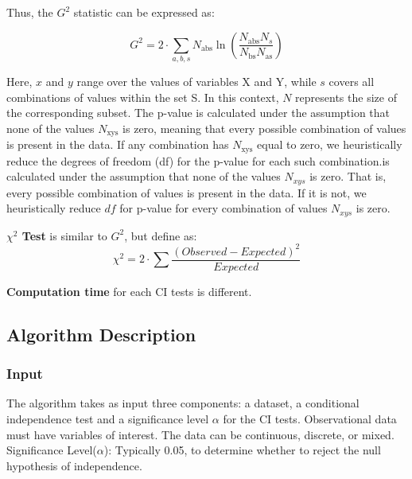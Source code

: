 \documentclass[main.tex]{subfiles}
\begin{document}
Thus, the $ G^2 $ statistic can be expressed as:

\[
G^2 = 2 \cdot \sum_{a,b,s} N_{\text{abs}} \ln \left( \frac{N_{\text{abs}} N_s}{N_{\text{bs}} N_{\text{as}}} \right)
\]

Here, $ x $ and $ y $ range over the values of variables X and Y, while $ s $ covers all combinations of values within the set S. In this context, $ N $ represents the size of the corresponding subset. The p-value is calculated under the assumption that none of the values $ N_{\text{xys}} $ is zero, meaning that every possible combination of values is present in the data. If any combination has $ N_{\text{xys}} $ equal to zero, we heuristically reduce the degrees of freedom (df) for the p-value for each such combination.is calculated under the assumption that none of the values $N_{xys}$ is zero. That 
is, every possible combination of values is present in the data. If it is not, we heuristically reduce $df$ for p-value for every combination of values $N_{xys}$ is zero.

\textbf{$ \chi^2 $ Test} is similar to $G^2$, but define as:
\[\chi ^2 = 2 \cdot \sum \frac{(Observed - Expected)^2}{Expected}\]

\textbf{Computation time} for each CI tests is different. 


\subsection{Algorithm Description}
\subsubsection{Input}
The algorithm takes as input three components: a dataset, a conditional independence test and a significance level $\alpha$ for the CI tests. Observational data must have variables of interest. The data can be continuous, discrete, or mixed.
Significance Level($\alpha$): Typically 0.05, to determine whether to reject the null hypothesis of independence.
\end{document}
